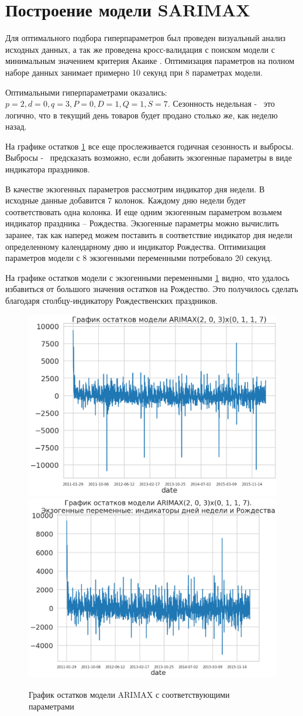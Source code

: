 \section{Построение модели SARIMAX}

Для оптимального подбора гиперпараметров был проведен
визуальный анализ исходных данных, а так же проведена
кросс-валидация с поиском модели с минимальным значением критерия Акаике \cite{akaike}.
Оптимизация параметров на полном наборе данных занимает примерно 10 секунд при 8 параметрах модели.

Оптимальными гиперпараметрами оказались:
$ p = 2, d = 0, q = 3, P = 0, D = 1, Q = 1, S = 7 $.
Сезонность недельная  -~ это логично, что в текущий день
товаров будет продано столько же, как неделю назад.

На графике остатков \ref{img:arimax_resid} все еще прослеживается
годичная сезонность и выбросы. Выбросы -~ предсказать возможно, если
добавить экзогенные параметры в виде индикатора праздников.

В качестве экзогенных параметров рассмотрим индикатор дня недели.
В исходные данные добавится 7 колонок. Каждому дню недели
будет соответствовать одна колонка. И еще одним экзогенным параметром
возьмем индикатор праздника -- Рождества.
Экзогенные параметры можно вычислить заранее, так как наперед можем
поставить в соответствие индикатор дня недели определенному календарному дню
и индикатор Рождества.
Оптимизация параметров модели с 8 экзогенными переменными потребовало 20 секунд.

На графике остатков модели с экзогенными переменными \ref{img:arimax_resid} видно, что удалось избавиться
от большого значения остатков на Рождество. Это получилось сделать благодаря
столбцу-индикатору Рождественских праздников.

\def\figurename{Рис}
\begin{figure}[t]
	\centering
	\includegraphics[width=0.4\columnwidth]{./img/arimax_resid.png}
	\includegraphics[width=0.4\columnwidth]{./img/arimax_resid_with_xmas.png}
	\caption{График остатков модели ARIMAX с соответствующими параметрами}
	\label{img:arimax_resid}
\end{figure}

